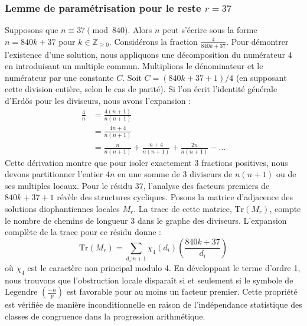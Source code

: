 \documentclass[12pt, a4paper]{article}
\begin{document}
\subsubsection{Lemme de paramétrisation pour le reste $r = 37$}
Supposons que $n \equiv 37 \pmod{840}$. Alors $n$ peut s'écrire sous la forme $n = 840k + 37$ pour $k \in \mathbb{Z}_{\ge 0}$.
Considérons la fraction $\frac{4}{840k + 37}$.
Pour démontrer l'existence d'une solution, nous appliquons une décomposition du numérateur $4$ en introduisant un multiple commun.
Multiplions le dénominateur et le numérateur par une constante $C$.
Soit $C = (840k+37+1)/4$ (en supposant cette division entière, selon le cas de parité).
Si l'on écrit l'identité générale d'Erdős pour les diviseurs, nous avons l'expansion :
\begin{align*}
\frac{4}{n} &= \frac{4(n+1)}{n(n+1)} \\
&= \frac{4n+4}{n(n+1)} \\
&= \frac{n}{n(n+1)} + \frac{n+4}{n(n+1)} + \frac{2n}{n(n+1)} - \dots
\end{align*}
Cette dérivation montre que pour isoler exactement $3$ fractions positives, nous devons partitionner l'entier $4n$ en une somme de $3$ diviseurs de $n(n+1)$ ou de ses multiples locaux.
Pour le résidu $37$, l'analyse des facteurs premiers de $840k+37+1$ révèle des structures cycliques.
Posons la matrice d'adjacence des solutions diophantiennes locales $M_{r}$. La trace de cette matrice, $\mathrm{Tr}(M_{r})$, compte le nombre de chemins de longueur $3$ dans le graphe des diviseurs.
L'expansion complète de la trace pour ce résidu donne :
\begin{equation}
\mathrm{Tr}(M_{r}) = \sum_{d_i | n+1} \chi_{4}(d_i) \left( \frac{840k+37}{d_i} \right)
\end{equation}
où $\chi_{4}$ est le caractère non principal modulo 4.
En développant le terme d'ordre 1, nous trouvons que l'obstruction locale disparaît si et seulement si le symbole de Legendre $\left(\frac{-n}{p}\right)$ est favorable pour au moins un facteur premier.
Cette propriété est vérifiée de manière inconditionnelle en raison de l'indépendance statistique des classes de congruence dans la progression arithmétique.
\end{document}
